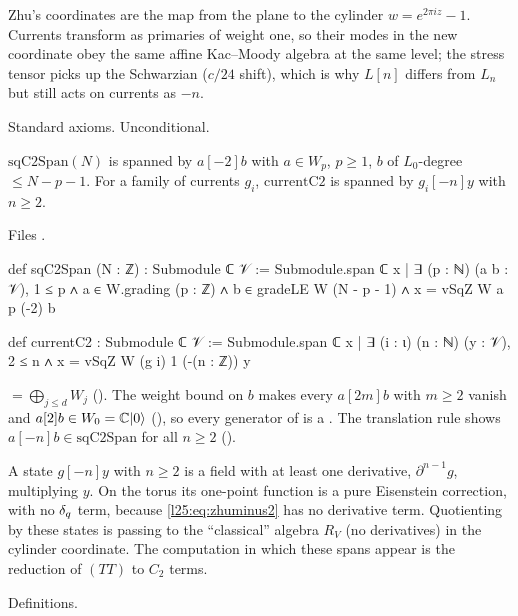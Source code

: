 \begin{physics}
Zhu's coordinates are the map from the plane to the cylinder $w=e^{2\pi i z}-1$. Currents transform as primaries of
weight one, so their modes in the new coordinate obey the same affine Kac--Moody algebra at the same level; the
stress tensor picks up the Schwarzian ($c/24$ shift), which is why $L[n]$ differs from $L_n$ but still acts on
currents as $-n$.
\end{physics}
\begin{status}
Standard axioms. Unconditional.
\end{status}

\begin{definition}\label{l25:def:spans}
$\mathrm{sqC2Span}(N)$ is spanned by $a[-2]b$ with $a\in W_p$, $p\ge1$, $b$ of $L_0$-degree $\le N-p-1$.
For a family of currents $g_i$, $\mathrm{currentC2}$ is spanned by $g_i[-n]y$ with $n\ge2$.
\end{definition}
\noindent Files .
\begin{leancode}
def sqC2Span (N : ℤ) : Submodule ℂ 𝒱 :=
  Submodule.span ℂ {x | ∃ (p : ℕ) (a b : 𝒱), 1 ≤ p ∧ a ∈ W.grading (p : ℤ) ∧
    b ∈ gradeLE W (N - p - 1) ∧ x = vSqZ W a p (-2) b}

def currentC2 : Submodule ℂ 𝒱 :=
  Submodule.span ℂ {x | ∃ (i : ι) (n : ℕ) (y : 𝒱), 2 ≤ n ∧ x = vSqZ W (g i) 1 (-(n : ℤ)) y}
\end{leancode}
\begin{dictionary}
 $=\bigoplus_{j\le d}W_j$ (). The weight bound on $b$ makes every
$a[2m]b$ with $m\ge2$ vanish and $a[2]b\in W_0={\mathbb{C}}|0\rangle$ (), so every generator of
 is a . The translation rule shows $a[-n]b\in\mathrm{sqC2Span}$ for all $n\ge2$
().
\end{dictionary}
\begin{physics}
A state $g[-n]y$ with $n\ge2$ is a field with at least one derivative, $\partial^{n-1}g$, multiplying $y$. On
the torus its one-point function is a pure Eisenstein correction, with no $\delta_q$ term, because
\eqref{l25:eq:zhuminus2} has no derivative term. Quotienting by these states is passing to the ``classical'' algebra
$R_V$ (no derivatives) in the cylinder coordinate. The computation in which these spans appear is the reduction of
$(TT)$ to $C_2$ terms.
\end{physics}
\begin{status}
Definitions.
\end{status}

